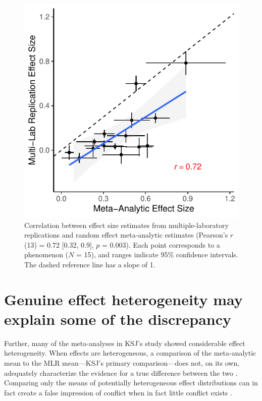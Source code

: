 \documentclass[man]{apa7}
\begin{document}
\begin{figure}[H]
\centering
     \includegraphics[width=5in]{figs/fig1a.pdf}
      \caption{  Correlation between effect size estimates from multiple-laboratory replications and random effect meta-analytic estimates (Pearson’s $r$(13) = 0.72 [0.32, 0.9], $p$ = 0.003). Each point corresponds to a phenomenon ($N$ = 15), and ranges indicate 95\% confidence intervals. The dashed reference line has a slope of 1. }
\end{figure}


\section{Genuine effect heterogeneity may explain some of the discrepancy}

Further, many of the meta-analyses in KSJ’s study showed considerable effect heterogeneity. When effects are heterogeneous, a comparison of the meta-analytic mean to the MLR mean---KSJ’s primary comparison---does not, on its own, adequately characterize the evidence for a true difference between the two \parencite{mathur2019new}. Comparing only the means of potentially heterogeneous effect distributions can in fact create a false impression of conflict when in fact little conflict exists \parencite{mathur2019new, mathur2019finding}. 
\end{document}

